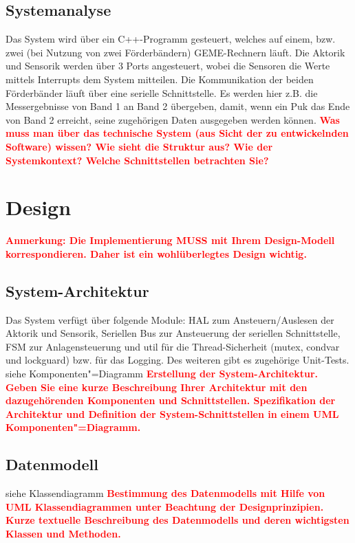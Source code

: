 \documentclass[oneside,a4paper,titlepage]{scrartcl} %
\begin{document}
\newpage

\subsection{Systemanalyse}
Das System wird über ein C++-Programm gesteuert, welches auf einem, bzw. zwei (bei Nutzung von zwei Förderbändern) GEME-Rechnern läuft. Die Aktorik und Sensorik werden über 3 Ports angesteuert, wobei die Sensoren die Werte mittels Interrupts dem System mitteilen.\newline
Die Kommunikation der beiden Förderbänder läuft über eine serielle Schnittstelle. Es werden hier z.B. die Messergebnisse von Band 1 an Band 2 übergeben, damit, wenn ein Puk das Ende von Band 2 erreicht, seine zugehörigen Daten ausgegeben werden können.\newline
\newline
\textcolor{red}{\textbf{Was muss man über das technische System (aus Sicht der zu entwickelnden Software) wissen?
Wie sieht die Struktur aus? Wie der Systemkontext? Welche Schnittstellen betrachten Sie?}}

\newpage

\section{Design}
\textcolor{red}{\textbf{Anmerkung: Die Implementierung MUSS mit Ihrem Design-Modell korrespondieren.
Daher ist ein wohlüberlegtes Design wichtig.}}

\subsection{System-Architektur}
Das System verfügt über folgende Module: HAL zum Ansteuern/Auslesen der Aktorik und Sensorik, Seriellen Bus zur Ansteuerung der seriellen Schnittstelle, FSM zur Anlagensteuerung und util für die Thread-Sicherheit (mutex, condvar und lockguard) bzw. für das Logging. Des weiteren gibt es zugehörige Unit-Tests.\newline
siehe Komponenten"=Diagramm\newline
\textcolor{red}{\textbf{Erstellung der System-Architektur. Geben Sie eine kurze Beschreibung Ihrer
Architektur mit den dazugehörenden Komponenten und Schnittstellen.
Spezifikation der Architektur und Definition der System-Schnittstellen in einem UML Komponenten"=Diagramm.}}

\subsection{Datenmodell}
siehe Klassendiagramm \newline
\textcolor{red}{\textbf{Bestimmung des Datenmodells mit Hilfe von UML Klassendiagrammen
unter Beachtung der Designprinzipien. Kurze textuelle Beschreibung des Datenmodells und
deren wichtigsten Klassen und Methoden.}}
\end{document}
